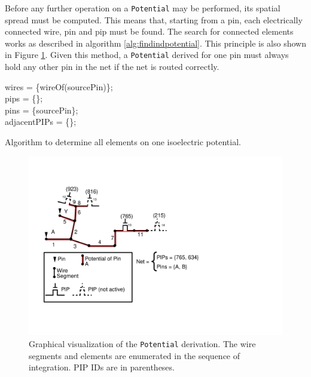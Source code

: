 Before any further operation on a \texttt{Potential} may be performed, its spatial spread must be computed. This means that, starting from a pin, each electrically connected wire, pin and pip must be found. The search for connected elements works as described in algorithm \ref{alg:findindpotential}. This principle is also shown in Figure \ref{fig:buildpotential}. Given this method, a \texttt{Potential} derived for one pin must always hold any other pin in the net if the net is routed correctly.

\begin{algorithm}[h]
	wires = \{wireOf(sourcePin)\};\\
	pips = \{\};\\
	pins = \{sourcePin\};\\
	adjacentPIPs = \{\};\\
 \caption{Algorithm to determine all elements on one isoelectric potential.}
 \label{alg:findingpotential}
\end{algorithm}

\begin{figure}
\centering
\includegraphics[scale=0.8]{images/buildpotential_buildup.pdf}
\caption{Graphical visualization of the \texttt{Potential} derivation. The wire segments and elements are enumerated in the sequence of integration. PIP IDs are in parentheses.}
\label{fig:buildpotential}
\end{figure}



